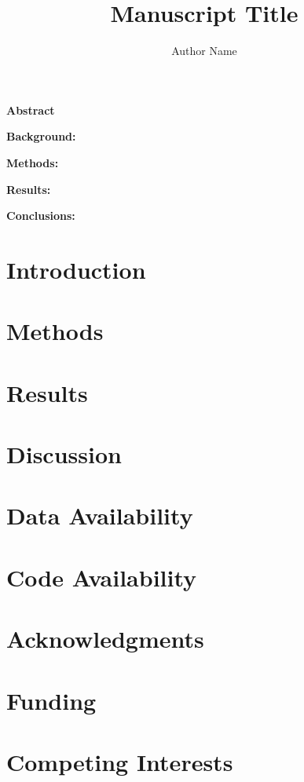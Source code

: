\documentclass[12pt]{article}
\title{Manuscript Title}
\author{Author Name}
\date{}
\begin{document}
\maketitle

\noindent\textbf{Abstract}

\noindent\textbf{Background:}

\noindent\textbf{Methods:}

\noindent\textbf{Results:}

\noindent\textbf{Conclusions:}

\section{Introduction}


\section{Methods}


\section{Results}


\section{Discussion}


\section*{Data Availability}

\section*{Code Availability}

\section*{Acknowledgments}

\section*{Funding}

\section*{Competing Interests}




\clearpage

\end{document}
